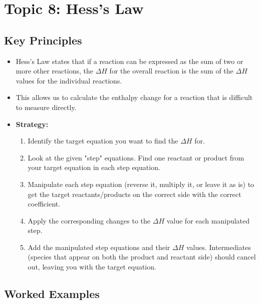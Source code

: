 \documentclass{article}
\begin{document}
\section{Topic 8: Hess's Law}
\subsection{Key Principles}
\begin{itemize}
    \item Hess's Law states that if a reaction can be expressed as the sum of two or more other reactions, the $\Delta H$ for the overall reaction is the sum of the $\Delta H$ values for the individual reactions.
    \item This allows us to calculate the enthalpy change for a reaction that is difficult to measure directly.
    \item \textbf{Strategy:}
        \begin{enumerate}
            \item Identify the target equation you want to find the $\Delta H$ for.
            \item Look at the given "step" equations. Find one reactant or product from your target equation in each step equation.
            \item Manipulate each step equation (reverse it, multiply it, or leave it as is) to get the target reactants/products on the correct side with the correct coefficient.
            \item Apply the corresponding changes to the $\Delta H$ value for each manipulated step.
            \item Add the manipulated step equations and their $\Delta H$ values. Intermediates (species that appear on both the product and reactant side) should cancel out, leaving you with the target equation.
        \end{enumerate}
\end{itemize}

\subsection{Worked Examples}
\end{document}
